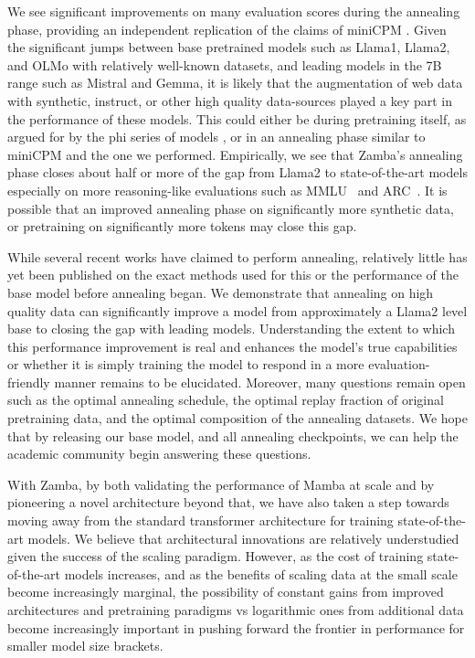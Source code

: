 We see significant improvements on many evaluation scores during the annealing phase, providing an independent replication of the claims of miniCPM \citep{hu2024minicpm}. Given the significant jumps between base pretrained models such as Llama1, Llama2, and OLMo with relatively well-known datasets, and leading models in the 7B range such as Mistral and Gemma, it is likely that the augmentation of web data with synthetic, instruct, or other high quality data-sources played a key part in the performance of these models. This could either be during pretraining itself, as argued for by the phi series of models \citep{li2023textbooks,abdin2024phi}, or in an annealing phase similar to miniCPM and the one we performed. Empirically, we see that Zamba's annealing phase closes about half or more of the gap from Llama2 to state-of-the-art models especially on more reasoning-like evaluations such as MMLU~\citep{mmlu} and ARC~\citep{arc}. It is possible that an improved annealing phase on significantly more synthetic data, or pretraining on significantly more tokens may close this gap. 

While several recent works have claimed to perform annealing, relatively little has yet been published on the exact methods used for this or the performance of the base model before annealing began. We demonstrate that annealing on high quality data can significantly improve a model from approximately a Llama2 level base to closing the gap with leading models. Understanding the extent to which this performance improvement is real and enhances the model's true capabilities or whether it is simply training the model to respond in a more evaluation-friendly manner remains to be elucidated. Moreover, many questions remain open such as the optimal annealing schedule, the optimal replay fraction of original pretraining data, and the optimal composition of the annealing datasets. We hope that by releasing our base model, and all annealing checkpoints, we can help the academic community begin answering these questions. 

With Zamba, by both validating the performance of Mamba at scale and by pioneering a novel architecture beyond that, we have also taken a step towards moving away from the standard transformer architecture for training state-of-the-art models. We believe that architectural innovations are relatively understudied given the success of the scaling paradigm. However, as the cost of training state-of-the-art models increases, and as the benefits of scaling data at the small scale become increasingly marginal, the possibility of constant gains from improved architectures and pretraining paradigms vs logarithmic ones from additional data become increasingly important in pushing forward the frontier in performance for smaller model size brackets.

